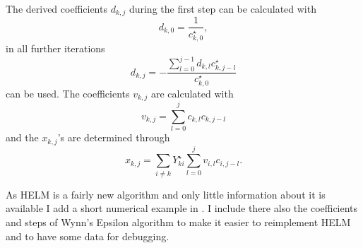The derived coefficients $d_{k,j}$ during the first step can be calculated with
\begin{equation}
	d_{k,0} = \frac{1}{c_{k,0}^\star},
\end{equation}
in all further iterations
\begin{equation}
	d_{k,j} = - \frac{\sum_{l = 0}^{j - 1} d_{k,l} c_{k,j - l}^\star}{c_{k,0}^\star}
\end{equation}
can be used. The coefficients $v_{k,j}$ are calculated with
\begin{equation}
	v_{k,j} = \sum_{l = 0}^j c_{k,l} c_{k,j - l}
\end{equation}
and the $x_{k,j}$'s are determined through
\begin{equation}
	x_{k,j} = \sum_{i \ne k} Y_{ki}^\star \sum_{l = 0}^j v_{i,l} c_{i,j - l}.
\end{equation}

As HELM is a fairly new algorithm and only little information about it is available I add a short numerical example in . I include there also the coefficients and steps of Wynn's Epsilon algorithm to make it easier to reimplement HELM and to have some data for debugging.